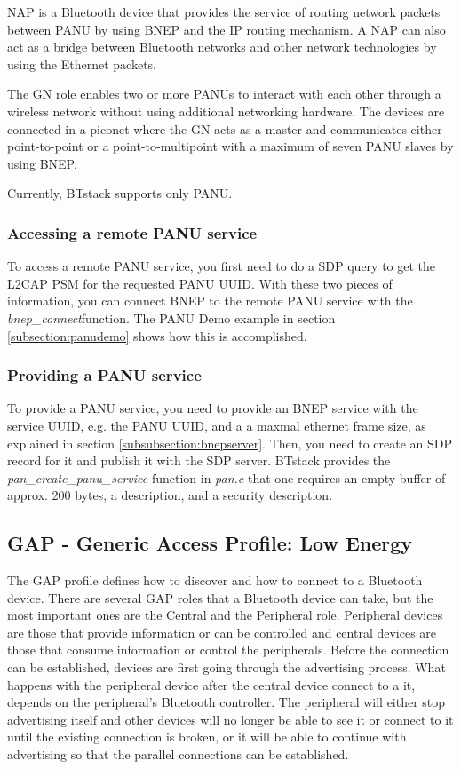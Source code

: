 NAP is a Bluetooth device that provides the service of routing network packets between PANU by using BNEP and the IP routing mechanism. A NAP can also act as a bridge between Bluetooth networks and other network technologies by using the Ethernet packets.

The GN role enables two or more PANUs to interact with each other through a wireless network without using additional networking hardware. The devices are connected in a piconet where the GN acts as a master and communicates either point-to-point or a point-to-multipoint with a maximum of seven PANU slaves by using BNEP.

Currently, BTstack supports only PANU.

\subsubsection{Accessing a remote PANU service}
To access a remote PANU service, you first need to do a SDP query to get the L2CAP PSM for the requested PANU UUID.
With these two pieces of information, you can connect BNEP to the remote PANU service with the \emph{bnep\_connect}function. The PANU Demo example in section \ref{subsection:panudemo} shows how this is accomplished.

\subsubsection{Providing a PANU service}
To provide a PANU service, you need to provide an BNEP service with the service UUID, e.g. the PANU UUID, and a a maxmal ethernet frame size, as explained in section \ref{subsubsection:bnepserver}. Then, you need to create an SDP record for it and publish it with the SDP server. BTstack provides the \emph{pan\_create\_panu\_service} function in \emph{pan.c} that one requires an empty buffer of approx. 200 bytes, a description, and a security description.

\subsection{GAP - Generic Access Profile: Low Energy}
The GAP profile defines how to discover and how to connect to a Bluetooth device. There are several GAP roles that a Bluetooth device can take, but the most important ones are the Central and the Peripheral role. Peripheral devices are those that provide information or can be controlled and central devices are those that consume information or control the peripherals. Before the connection can be established, devices are first going through the advertising process. What happens with the peripheral device after the central device connect to a it, depends on the peripheral's Bluetooth controller. The peripheral will either stop advertising itself and other devices will no longer be able to see it or connect to it until the existing connection is broken, or it will be able to continue with advertising so that the parallel connections can be established.

